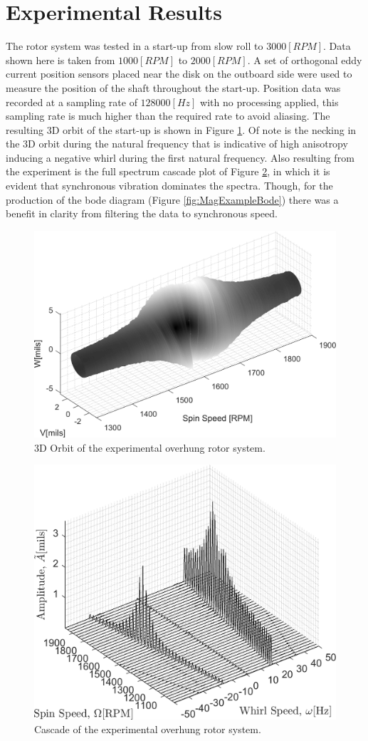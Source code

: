 \section{Experimental Results}
The rotor system was tested in a start-up from slow roll to $ 3000[RPM] $. Data shown here is taken from $ 1000[RPM] $ to $ 2000[RPM] $. A set of orthogonal eddy current position sensors placed near the disk on the outboard side were used to measure the position of the shaft throughout the start-up. Position data was recorded at a sampling rate of $ 128000[Hz] $ with no processing applied, this sampling rate is much higher than the required rate to avoid aliasing. The resulting 3D orbit of the start-up is shown in Figure \ref{fig:MagExampleOrbit3D}. Of note is the necking in the 3D orbit during the natural frequency that is indicative of high anisotropy inducing a negative whirl during the first natural frequency. Also resulting from the experiment is the full spectrum cascade plot of Figure \ref{fig:MagExampleCascade}, in which it is evident that synchronous vibration dominates the spectra. Though, for the production of the bode diagram (Figure \ref{fig:MagExampleBode}) there was a benefit in clarity from filtering the data to synchronous speed.
\begin{figure}
	\centering
	\includegraphics[width=.5\linewidth]{./figures/MagExpExampleOrbit3D.png}
	\caption{3D Orbit of the experimental overhung rotor system.}
	\label{fig:MagExampleOrbit3D}
\end{figure}
\begin{figure}
	\centering
	\includegraphics[width=.8\linewidth]{./figures/MagExampleCascade.png}
	\caption{Cascade of the experimental overhung rotor system.}
	\label{fig:MagExampleCascade}
\end{figure}
